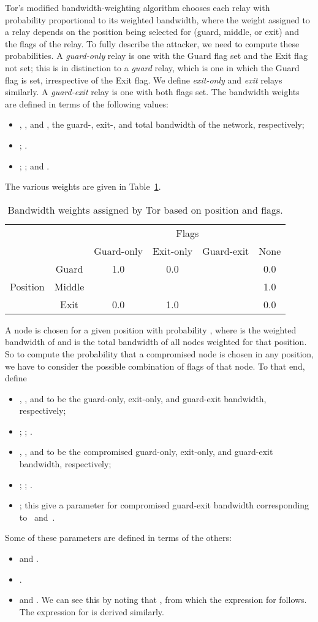 \documentclass[]{lmcs}
\begin{document}
Tor's modified bandwidth-weighting algorithm 
chooses each relay with probability proportional to its weighted
bandwidth, where the weight assigned to a relay depends on
the position being selected for (guard, middle, or exit) and
the flags of the relay.  To fully describe the attacker,
we need to compute these probabilities.
A \emph{guard-only} relay is one with the 
Guard flag set and the Exit flag not set; this is
in distinction to a \emph{guard} relay, which is one
in which the Guard flag is set, irrespective of the
Exit flag.  We define \emph{exit-only} and \emph{exit} relays
similarly.
A \emph{guard-exit} relay is one with both flags set.
The bandwidth weights are defined in terms of the following values:
\begin{itemize}
\item , , and , the guard-, exit-, and total bandwidth
of the network, respectively;
\item ; .
\item ; ; and
.
\end{itemize}
The various weights are given in Table~\ref{tbl:weights}.
\begin{table}
\begin{center}
\begin{tabular}{cc|cccc}
& & \multicolumn{4}{c}{Flags} \\
& & Guard-only & Exit-only & Guard-exit & None \\
\hline
& Guard	& 1.0	& 0.0	& 		& 0.0 \\
Position & Middle	& 	& 	& 	& 1.0 \\
& Exit	& 0.0	& 1.0	& 		& 0.0
\end{tabular}
\end{center}
\caption{Bandwidth weights assigned by Tor based on position and
flags.}
\label{tbl:weights}
\end{table}

A node  is chosen for a given position with probability
, where  is the weighted bandwidth of  and
 is the total bandwidth of all nodes weighted for that position.
So to compute the probability that a compromised node is chosen in any
position, we have to consider the possible combination of
flags of that node.
To that end, define
\begin{itemize}
\item , , and  to be the guard-only, exit-only, and
guard-exit bandwidth, respectively;
\item ; ; .
\item , , and  to be the compromised guard-only, exit-only, and
guard-exit bandwidth, respectively;
\item ; ; .
\item ; this give a parameter for compromised guard-exit bandwidth
corresponding to~ and~.
\end{itemize}
Some of these parameters are defined in terms of the others:
\begin{itemize}
\item  and .
\item .
\item  and .
We can see this by noting that 
, from which
the expression for  follows.  The expression for  is
derived similarly.
\end{itemize}
\end{document}
